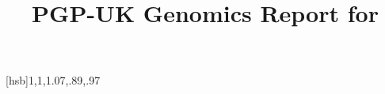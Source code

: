 \documentclass{article}
\begin{document}
\title{PGP-UK Genomics Report for }
\author{\vspace{-5ex}}
\date{\vspace{-5ex}}

\maketitle





[hsb]{1,1,1}{.07,.89,.97} 
%

\newcommand{\slice}[4]{
     \pgfmathsetmacro{\midangle}{0.5*#1+0.5*#2}
     \begin{scope}
\clip (0,0) -- (#1:1) arc (#1:#2:1) -- cycle;
\colorlet{SliceColor}{myseries!!+}%
\fill[inner color=SliceColor!30,outer color=SliceColor!60] (0,0) circle (1cm);
     \end{scope}
     \draw[thick] (0,0) -- (#1:1) arc (#1:#2:1) -- cycle;
     \node[label=\midangle:#4] at (\midangle:1) {};
     \pgfmathsetmacro{\temp}{min((#2-#1-10)/110*(-0.3),0)}
     \pgfmathsetmacro{\innerpos}{max(\temp,-0.5) + 0.8}
     \node at (\midangle:\innerpos) {#3};
}


\newcommand{\makechart}[2]{
    \csvreader[before reading=\def\mysum{0}]{#1}{Count=\Count}{ %
    \pgfmathsetmacro{\mysum}{\mysum+\Count}%
    }

\begin{centering}

    \begin{tikzpicture}[scale=2.5]%
    \def\mya{0}\def\myb{0}
    \csvreader[head to column names]{#1}{}{%
         \let\mya\myb
         \pgfmathsetmacro{\myb}{\myb+\Count}
         \slice{\mya/\mysum*360}{\myb/\mysum*360}{\Count\%}{\Label}
     }
    \end{tikzpicture}%
   \captionof{figure}{#2}

\par\end{centering}

    
}


\end{document}
